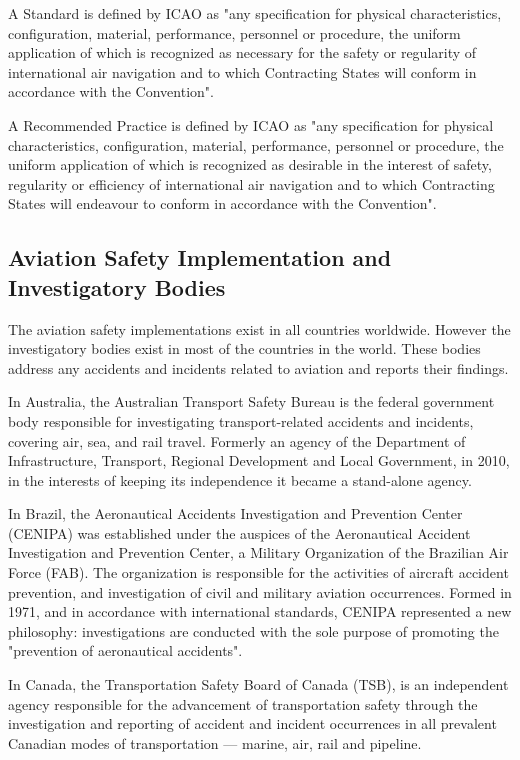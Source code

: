 \documentclass[a4paper, 10pt]{article}
\begin{document}
A Standard is defined by ICAO as "any specification for physical characteristics, configuration, material, performance, personnel or procedure, the uniform application of which is recognized as necessary for the safety or regularity of international air navigation and to which Contracting States will conform in accordance with the Convention".\par

A Recommended Practice is defined by ICAO as "any specification for physical characteristics, configuration, material, performance, personnel or procedure, the uniform application of which is recognized as desirable in the interest of safety, regularity or efficiency of international air navigation and to which Contracting States will endeavour to conform in accordance with the Convention".\par

\subsection{Aviation Safety Implementation and Investigatory Bodies}
The aviation safety implementations exist in all countries worldwide. However the investigatory bodies exist in most of the countries in the world. These bodies address any accidents and incidents related to aviation and reports their findings.\par

In Australia, the Australian Transport Safety Bureau is the federal government body responsible for investigating transport-related accidents and incidents, covering air, sea, and rail travel. Formerly an agency of the Department of Infrastructure, Transport, Regional Development and Local Government, in 2010, in the interests of keeping its independence it became a stand-alone agency.\par
In Brazil, the Aeronautical Accidents Investigation and Prevention Center (CENIPA) was established under the auspices of the Aeronautical Accident Investigation and Prevention Center, a Military Organization of the Brazilian Air Force (FAB). The organization is responsible for the activities of aircraft accident prevention, and investigation of civil and military aviation occurrences. Formed in 1971, and in accordance with international standards, CENIPA represented a new philosophy: investigations are conducted with the sole purpose of promoting the "prevention of aeronautical accidents".\par

In Canada, the Transportation Safety Board of Canada (TSB), is an independent agency responsible for the advancement of transportation safety through the investigation and reporting of accident and incident occurrences in all prevalent Canadian modes of transportation — marine, air, rail and pipeline.\par
\end{document}
